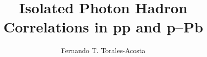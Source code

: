 \documentclass{ucbthesis}
\begin{document}

\title{Isolated Photon Hadron Correlations in pp and p--Pb}
\author{Fernando T. Torales-Acosta}

\maketitle
\approvalpage
\copyrightpage


\end{document}
